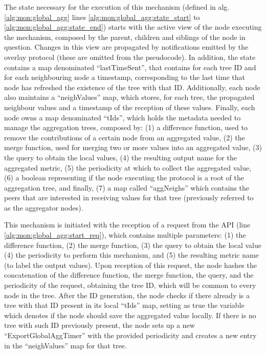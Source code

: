 

The state necessary for the execution of this mechanism (defined in alg. \ref{alg:mon:global_agg} lines \ref{alg:mon:global_agg:state_start} to \ref{alg:mon:global_agg:state_end}) starts with the active view of the node executing the mechanism, composed by the parent, children and siblings of the node in question. Changes in this view are propagated by notifications emitted by the overlay protocol (these are omitted from the pseudocode). In addition, the state contains a map denominated ``lastTimeSent'', that contains for each tree ID and for each neighbouring node a timestamp, corresponding to the last time that node has refreshed the existence of the tree with that ID. Additionally, each node also maintains a ``neighValues'' map, which stores, for each tree, the propagated neighbour values and a timestamp of the reception of these values. Finally, each node owns a map denominated ``tIds'',  which holds the metadata needed to manage the aggregation trees, composed by: (1) a difference function, used to remove the contributions of a certain node from an aggregated value, (2) the merge function, used for merging two or more values into an aggregated value, (3) the query to obtain the local values, (4) the resulting output name for the aggregated metric, (5) the periodicity at which to collect the aggregated value, (6) a boolean representing if the node executing the protocol is a root of the aggregation tree, and finally, (7) a map called ``aggNeighs'' which contains the peers that are interested in receiving values for that tree (previously referred to as the aggregator nodes).

This mechanism is initiated with the reception of a request from the API (line \ref{alg:mon:global_agg:start_req}), which contains multiple parameters: (1) the difference function, (2) the merge function, (3) the query to obtain the local value (4) the periodicity to perform this mechanism, and (5) the resulting metric name (to label the output values). Upon reception of this request, the node hashes the concatenation of the difference function, the merge function, the query, and the periodicity of the request, obtaining the tree ID, which will be common to every node in the tree. After the ID generation, the node checks if there already is a tree with that ID present in its local ``tIds'' map, setting as true the variable which denotes if the node should save the aggregated value locally. If there is no tree with such ID previously present, the node sets up a new ``ExportGlobalAggTimer'' with the provided periodicity and creates a new entry in the ``neighValues'' map for that tree.


